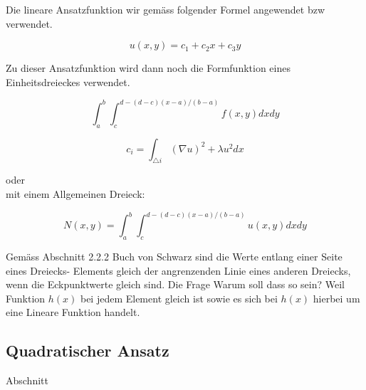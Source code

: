 Die lineare Ansatzfunktion wir gemäss folgender Formel angewendet bzw verwendet.

\begin{equation}
u(x,y) = c_1 + c_2x + c_3y
\label{fem:equationSchwarzLinear}
\end{equation}

Zu dieser Ansatzfunktion wird dann noch die Formfunktion eines Einheitsdreieckes verwendet.


\begin{equation}
\int_a^b \int_c^{d-(d-c)(x-a)/(b-a)} f(x,y) dx dy
\label{fem:equation3}
\end{equation}




\begin{equation}
c_i= \int_{\triangle i} (\nabla u)^2 +\lambda u^2 dx
\label{fem:equation3}
\end{equation}

oder\\
mit einem Allgemeinen Dreieck:

\begin{equation}
N(x,y) = \int_a^b\int_c^{d-(d-c)(x-a)/(b-a)} u(x,y) dxdy
\label{fem:Dreieck_alg}
\end{equation}

Gemäss Abschnitt 2.2.2 Buch von Schwarz sind die Werte entlang einer Seite eines Dreiecks- Elements gleich  der angrenzenden Linie eines anderen Dreiecks, wenn die Eckpunktwerte gleich sind. Die Frage Warum soll dass so sein? Weil Funktion $h(x)$ bei jedem Element gleich ist sowie es sich bei $h(x)$ hierbei um eine Lineare Funktion handelt.

\subsection{Quadratischer Ansatz
\label{fem:subsection:bonorum}}
 Abschnitt 
